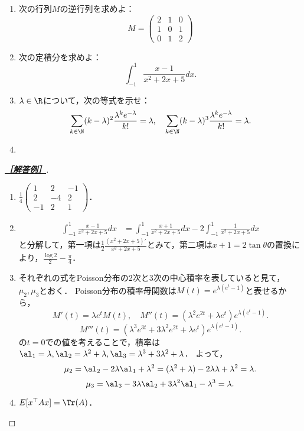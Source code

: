 \documentclass[uplatex,dvipdfmx]{jsarticle}
\begin{document}
\begin{tcolorbox}[colframe=ForestGreen, colback=ForestGreen!10!white,breakable,colbacktitle=ForestGreen!40!white,coltitle=black,fonttitle=\bfseries\sffamily,
    title=第１問]
    \begin{enumerate}
        \item 次の行列$M$の逆行列を求めよ：
        \[M=\begin{pmatrix}2&1&0\\1&0&1\\0&1&2\end{pmatrix}\]
        \item 次の定積分を求めよ：
        \[\int^1_{-1}\frac{x-1}{x^2+2x+5}dx.\]
        \item $\lambda\in\R$について，次の等式を示せ：
        \[\sum_{k\in\N}(k-\lambda)^2\frac{\lambda^ke^{-\lambda}}{k!}=\lambda,\quad\sum_{k\in\N}(k-\lambda)^3\frac{\lambda^ke^{-\lambda}}{k!}=\lambda.\]
        \item 
    \end{enumerate}
\end{tcolorbox}
\begin{proof}[\textbf{\underline{［解答例］}}]\mbox{}
    \begin{enumerate}
        \item $\frac{1}{4}\begin{pmatrix}1&2&-1\\2&-4&2\\-1&2&1\end{pmatrix}$．
        \item \begin{align*}
            \int^1_{-1}\frac{x-1}{x^2+2x+5}dx&=\int^1_{-1}\frac{x+1}{x^2+2x+5}dx-2\int^1_{-1}\frac{1}{x^2+2x+5}dx
        \end{align*}
        と分解して，第一項は$\frac{1}{2}\frac{(x^2+2x+5)'}{x^2+2x+5}$とみて，第二項は$x+1=2\tan\theta$の置換により，$\frac{\log 2}{2}-\frac{\pi}{4}$．
        \item それぞれの式をPoisson分布の2次と3次の中心積率を表していると見て，$\mu_2,\mu_3$とおく．
        Poisson分布の積率母関数は$M(t)=e^{\lambda(e^t-1)}$と表せるから，
        \[M'(t)=\lambda e^{t}M(t),\quad M''(t)=(\lambda^2 e^{2t}+\lambda e^t)e^{\lambda(e^t-1)}.\]
        \[M'''(t)=(\lambda^3e^{3t}+3\lambda^2e^{2t}+\lambda e^t)e^{\lambda(e^t-1)}.\]
        の$t=0$での値を考えることで，積率は$\al_1=\lambda,\al_2=\lambda^2+\lambda,\al_3=\lambda^3+3\lambda^2+\lambda$．
        よって，
        \[\mu_2=\al_2-2\lambda\al_1+\lambda^2=(\lambda^2+\lambda)-2\lambda\lambda+\lambda^2=\lambda.\]
        \[\mu_3=\al_3-3\lambda\al_2+3\lambda^2\al_1-\lambda^3=\lambda.\]
        \item $E[x^\top Ax]=\Tr(A)$．
    \end{enumerate}
\end{proof}
\end{document}
